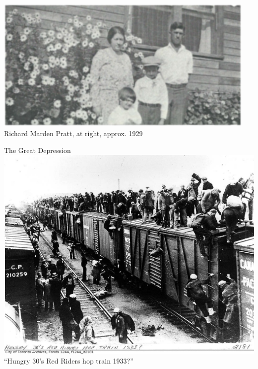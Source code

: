 \begin{frame}
    \centering
    \includegraphics[width=0.95\textwidth]{img/pratt-family.png} \\
    Richard Marden Pratt, at right, approx. 1929 \\
\end{frame}

\begin{frame}{The Great Depression}
    \centering
    \includegraphics[height=0.80\textheight]{img/UnemployedMenHopTrain.jpg} \\
    ``Hungry 30's Red Riders hop train 1933?'' \\
\end{frame}


